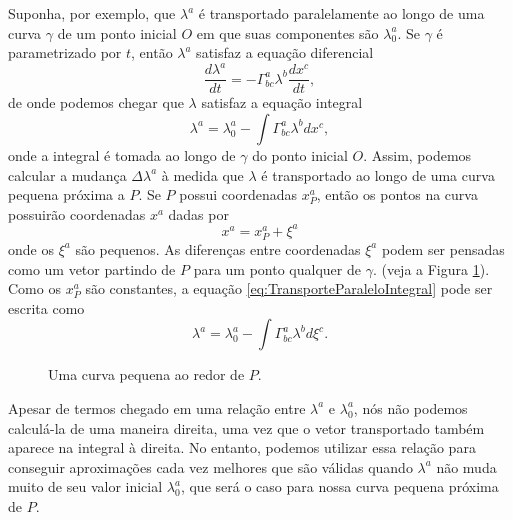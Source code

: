 Suponha, por exemplo, que $\lambda^a$ é transportado paralelamente ao longo de uma curva $\gamma$ de um ponto inicial $O$ em que suas componentes são $\lambda_0^a$. Se $\gamma$ é parametrizado por $t$, então $\lambda^a$ satisfaz a equação diferencial
\begin{equation}\label{eq:TransporteParaleloDiferencial}
	\frac{d\lambda^a}{dt} = -\Gamma^a_{bc}\lambda^b\frac{dx^c}{dt},
\end{equation}
de onde podemos chegar que $\lambda$ satisfaz a equação integral
\begin{equation}\label{eq:TransporteParaleloIntegral}
	\lambda^a = \lambda^a_0 - \int\Gamma^a_{bc}\lambda^b dx^c,
\end{equation}
onde a integral é tomada ao longo de $\gamma$ do ponto inicial $O$. Assim, podemos calcular a mudança $\Delta\lambda^a$ à medida que $\lambda$ é transportado ao longo de uma curva pequena próxima a $P$. Se $P$ possui coordenadas $x^a_P$, então os pontos na curva possuirão coordenadas $x^a$ dadas por
\[
	x^a=x^a_P+\xi^a
\]
onde os $\xi^a$ são pequenos. As diferenças entre coordenadas $\xi^a$ podem ser pensadas como um vetor partindo de $P$ para um ponto qualquer de $\gamma$. (veja a Figura \ref{fig:SmallLoop}). Como os $x^a_P$ são constantes, a equação \eqref{eq:TransporteParaleloIntegral} pode ser escrita como
\begin{equation}\label{eq:TransporteParaleloIntegralXi}
	\lambda^a=\lambda^a_0 - \int\Gamma^a_{bc}\lambda^b d\xi^c .
\end{equation}

\begin{figure}[t]
	\centering
	\caption{Uma curva pequena ao redor de $P$.}
	\label{fig:SmallLoop}
\end{figure}

Apesar de termos chegado em uma relação entre $\lambda^a$ e $\lambda^a_0$, nós não podemos calculá-la de uma maneira direita, uma vez que o vetor transportado também aparece na integral à direita. No entanto, podemos utilizar essa relação para conseguir aproximações cada vez melhores que são válidas quando $\lambda^a$ não muda muito de seu valor inicial $\lambda^a_0$, que será o caso para nossa curva pequena próxima de $P$.

